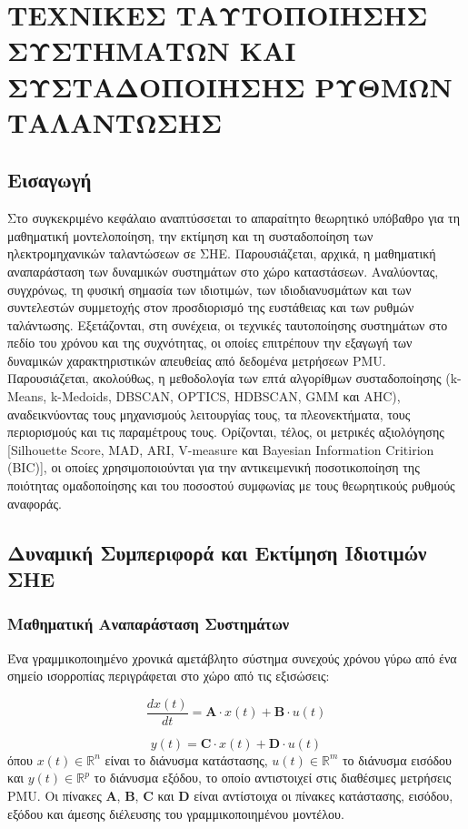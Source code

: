 \chapter{ΤΕΧΝΙΚΕΣ ΤΑΥΤΟΠΟΙΗΣΗΣ ΣΥΣΤΗΜΑΤΩΝ ΚΑΙ ΣΥΣΤΑΔΟΠΟΙΗΣΗΣ ΡΥΘΜΩΝ ΤΑΛΑΝΤΩΣΗΣ}

\section{Εισαγωγή}
Στο συγκεκριμένο κεφάλαιο αναπτύσσεται το απαραίτητο θεωρητικό υπόβαθρο για τη μαθηματική μοντελοποίηση, την εκτίμηση και τη συσταδοποίηση των ηλεκτρομηχανικών ταλαντώσεων σε ΣΗΕ. Παρουσιάζεται, αρχικά, η μαθηματική αναπαράσταση των δυναμικών συστημάτων στο χώρο καταστάσεων. Αναλύοντας, συγχρόνως, τη φυσική σημασία των ιδιοτιμών, των ιδιοδιανυσμάτων και των συντελεστών συμμετοχής στον προσδιορισμό της ευστάθειας και των ρυθμών ταλάντωσης. Εξετάζονται, στη συνέχεια, οι τεχνικές ταυτοποίησης συστημάτων στο πεδίο του χρόνου και της συχνότητας, οι οποίες επιτρέπουν την εξαγωγή των δυναμικών χαρακτηριστικών απευθείας από δεδομένα μετρήσεων PMU. Παρουσιάζεται, ακολούθως, η μεθοδολογία των επτά αλγορίθμων συσταδοποίησης (k-Means, k-Medoids, DBSCAN, OPTICS, HDBSCAN, GMM και AHC), αναδεικνύοντας τους μηχανισμούς λειτουργίας τους, τα πλεονεκτήματα, τους περιορισμούς και τις παραμέτρους τους. Ορίζονται, τέλος, οι μετρικές αξιολόγησης  [Silhouette Score, MAD,  ARI, V-measure και Bayesian Information Critirion (BIC)], οι οποίες χρησιμοποιούνται για την αντικειμενική ποσοτικοποίηση της ποιότητας ομαδοποίησης και του ποσοστού συμφωνίας με τους θεωρητικούς ρυθμούς αναφοράς.
\section{Δυναμική Συμπεριφορά και Εκτίμηση Ιδιοτιμών ΣΗΕ}
\subsection{Μαθηματική Αναπαράσταση Συστημάτων}

Ένα γραμμικοποιημένο χρονικά αμετάβλητο σύστημα συνεχούς χρόνου γύρω από ένα σημείο ισορροπίας περιγράφεται στο χώρο από τις εξισώσεις:

\begin{equation}
\frac{dx(t)}{dt} = \mathbf{A} \cdot x(t) + \mathbf{B} \cdot u(t)
\label{eq:state-equation}
\end{equation}

\begin{equation}
y(t) = \mathbf{C} \cdot x(t) + \mathbf{D} \cdot u(t)
\label{eq:output-equation}
\end{equation}
όπου $x(t) \in \mathbb{R}^{n}$ είναι το διάνυσμα κατάστασης, $u(t) \in \mathbb{R}^{m}$ το διάνυσμα εισόδου και $y(t) \in \mathbb{R}^{p}$ το διάνυσμα εξόδου, το οποίο αντιστοιχεί στις διαθέσιμες μετρήσεις PMU. Οι πίνακες $\mathbf{A}$, $\mathbf{B}$, $\mathbf{C}$ και $\mathbf{D}$ είναι αντίστοιχα οι πίνακες κατάστασης, εισόδου, εξόδου και άμεσης διέλευσης του γραμμικοποιημένου μοντέλου.

